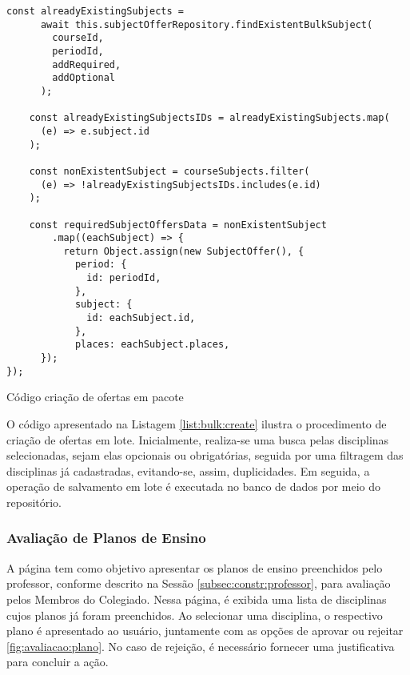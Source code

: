 \begin{listing}[h]
    \begin{verbatim}
const alreadyExistingSubjects =
      await this.subjectOfferRepository.findExistentBulkSubject(
        courseId,
        periodId,
        addRequired,
        addOptional
      );

    const alreadyExistingSubjectsIDs = alreadyExistingSubjects.map(
      (e) => e.subject.id
    );

    const nonExistentSubject = courseSubjects.filter(
      (e) => !alreadyExistingSubjectsIDs.includes(e.id)
    );

    const requiredSubjectOffersData = nonExistentSubject
        .map((eachSubject) => {
          return Object.assign(new SubjectOffer(), {
            period: {
              id: periodId,
            },
            subject: {
              id: eachSubject.id,
            },
            places: eachSubject.places,
      });
});
    \end{verbatim}
    \caption{Código criação de ofertas em pacote}
    \label{list:bulk:create}
\end{listing}


O código apresentado na Listagem \ref{list:bulk:create} ilustra o procedimento de criação de ofertas em lote. Inicialmente, realiza-se uma busca pelas disciplinas selecionadas, sejam elas opcionais ou obrigatórias, seguida por uma filtragem das disciplinas já cadastradas, evitando-se, assim, duplicidades. Em seguida, a operação de salvamento em lote é executada no banco de dados por meio do repositório.

\subsubsection{Avaliação de Planos de Ensino}

A página tem como objetivo apresentar os planos de ensino preenchidos pelo professor, conforme descrito na Sessão \ref{subsec:constr:professor}, para avaliação pelos Membros do Colegiado. Nessa página, é exibida uma lista de disciplinas cujos planos já foram preenchidos. Ao selecionar uma disciplina, o respectivo plano é apresentado ao usuário, juntamente com as opções de aprovar ou rejeitar \ref{fig:avaliacao:plano}. No caso de rejeição, é necessário fornecer uma justificativa para concluir a ação.




